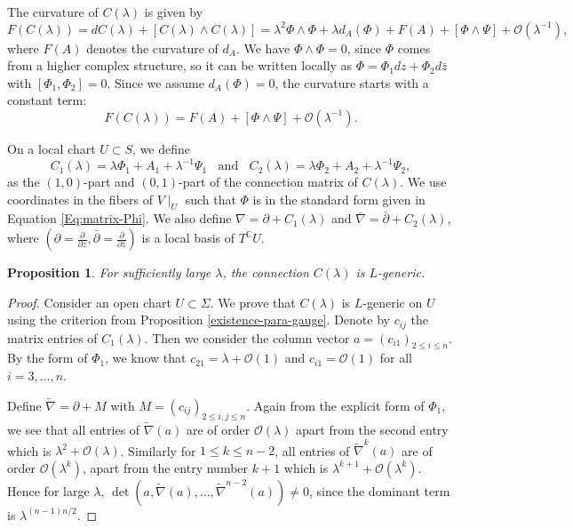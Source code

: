 \documentclass[11pt]{amsart}
\newtheorem{prop}[thm]{Proposition}
\numberwithin{thm}{section} %
\numberwithin{equation}{section} %
\numberwithin{figure}{section} %
\newcommand*{\C}{\mathbb{C}}
\renewcommand*{\S}{S}
\renewcommand*{\l}{\lambda}
\begin{document}
The curvature of $C(\l)$ is given by
\begin{equation}\label{Eq:curv-c-lambda}
F(C(\l))=dC(\l)+[C(\l)\wedge C(\l)] = \l^2\Phi\wedge\Phi+\l d_A(\Phi)+F(A)+[\Phi\wedge\Psi]+\mathcal{O}(\l^{-1}),
\end{equation}
where $F(A)$ denotes the curvature of $d_A$. We have $\Phi\wedge\Phi=0$, since $\Phi$ comes from a higher complex structure, so it can be written locally as $\Phi=\Phi_1dz+\Phi_2d\bar{z}$ with $[\Phi_1,\Phi_2]=0$. Since we assume $d_A(\Phi)=0$, the curvature starts with a constant term:
\begin{equation}\label{Eq:curv-3-term}
F(C(\l))=F(A)+[\Phi\wedge\Psi]+\mathcal{O}(\l^{-1}).
\end{equation}

On a local chart $U\subset \S$, we define 
$$C_1(\l)=\l \Phi_1 + A_1 +\l^{-1}\Psi_1 \;\;\text{ and }\;\; C_2(\l)=\l \Phi_2 + A_2 + \l^{-1}\Psi_2,$$
as the $(1,0)$-part and $(0,1)$-part of the connection matrix of $C(\l)$. We use coordinates in the fibers of $V\!\mid_U$ such that $\Phi$ is in the standard form given in Equation \eqref{Eq:matrix-Phi}. We also define $\nabla=\partial + C_1(\l)$ and $\bar{\nabla}=\bar{\partial}+C_2(\l)$, where $(\partial=\tfrac{\partial}{\partial z},\bar\partial=\tfrac{\partial}{\partial\bar{z}})$ is a local basis of $T^\C U$.

\begin{prop}
For sufficiently large $\l$, the connection $C(\l)$ is $L$-generic.
\end{prop}
\begin{proof}
Consider an open chart $U\subset \Sigma$. We prove that $C(\l)$ is $L$-generic on $U$ using the criterion from Proposition \ref{existence-para-gauge}. Denote by $c_{ij}$ the matrix entries of $C_1(\l)$. Then we consider the column vector $a=(c_{i1})_{2\leq i\leq n}$. By the form of $\Phi_1$, we know that $c_{21}=\lambda+\mathcal{O}(1)$ and $c_{i1}=\mathcal{O}(1)$ for all $i=3,...,n$.

Define $\widetilde{\nabla}=\partial+M$ with $M=(c_{ij})_{2\leq i,j\leq n}$. Again from the explicit form of $\Phi_1$, we see that all entries of $\widetilde{\nabla}(a)$ are of order $\mathcal{O}(\l)$ apart from the second entry which is $\lambda^2+\mathcal{O}(\l)$. Similarly for $1\leq k\leq n-2$, all entries of $\widetilde{\nabla}^k(a)$ are of order $\mathcal{O}(\l^k)$, apart from the entry number $k+1$ which is $\l^{k+1}+\mathcal{O}(\l^k)$. Hence for large $\l$, $\det(a,\widetilde{\nabla}(a),...,\widetilde{\nabla}^{n-2}(a))\neq 0$, since the dominant term is $\l^{(n-1)n/2}$.
\end{proof}
\end{document}
